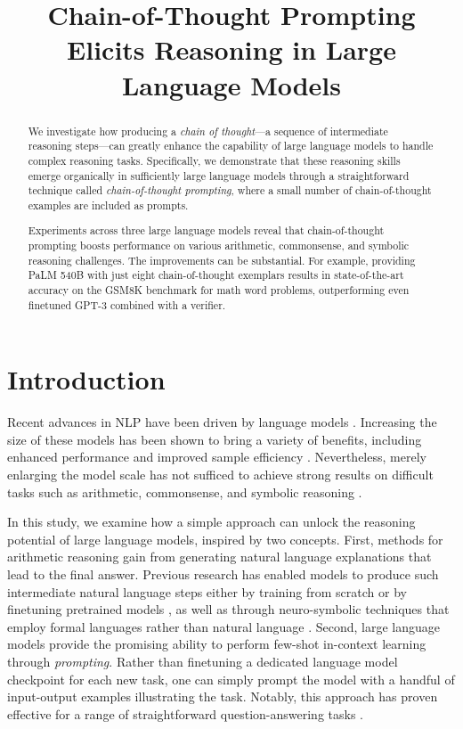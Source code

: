 \title{Chain-of-Thought Prompting Elicits Reasoning in Large Language Models}

\begin{abstract}
We investigate how producing a \textit{chain of thought}—a sequence of intermediate reasoning steps—can greatly enhance the capability of large language models to handle complex reasoning tasks. Specifically, we demonstrate that these reasoning skills emerge organically in sufficiently large language models through a straightforward technique called \textit{chain-of-thought prompting}, where a small number of chain-of-thought examples are included as prompts.

Experiments across three large language models reveal that chain-of-thought prompting boosts performance on various arithmetic, commonsense, and symbolic reasoning challenges. The improvements can be substantial. For example, providing PaLM 540B with just eight chain-of-thought exemplars results in state-of-the-art accuracy on the GSM8K benchmark for math word problems, outperforming even finetuned GPT-3 combined with a verifier.
\end{abstract}

\section{Introduction}
Recent advances in NLP have been driven by language models \citep[][\textit{inter alia}]{peters-etal-2018-deep,devlin-etal-2019-bert,brown2020language}. Increasing the size of these models has been shown to bring a variety of benefits, including enhanced performance and improved sample efficiency \citep[\textit{inter alia}]{kaplan2020scaling,brown2020language}. Nevertheless, merely enlarging the model scale has not sufficed to achieve strong results on difficult tasks such as arithmetic, commonsense, and symbolic reasoning \citep{rae2021scaling}.

In this study, we examine how a simple approach can unlock the reasoning potential of large language models, inspired by two concepts. First, methods for arithmetic reasoning gain from generating natural language explanations that lead to the final answer. Previous research has enabled models to produce such intermediate natural language steps either by training from scratch \citep{ling-etal-2017-program} or by finetuning pretrained models \citep{cobbe2021training}, as well as through neuro-symbolic techniques that employ formal languages rather than natural language \citep{roy-roth-2015-solving, chiang-chen-2019-semantically,amini-etal-2019-mathqa, chen2019neural}. Second, large language models provide the promising ability to perform few-shot in-context learning through \emph{prompting}. Rather than finetuning a dedicated language model checkpoint for each new task, one can simply prompt the model with a handful of input-output examples illustrating the task. Notably, this approach has proven effective for a range of straightforward question-answering tasks \citep{brown2020language}.

